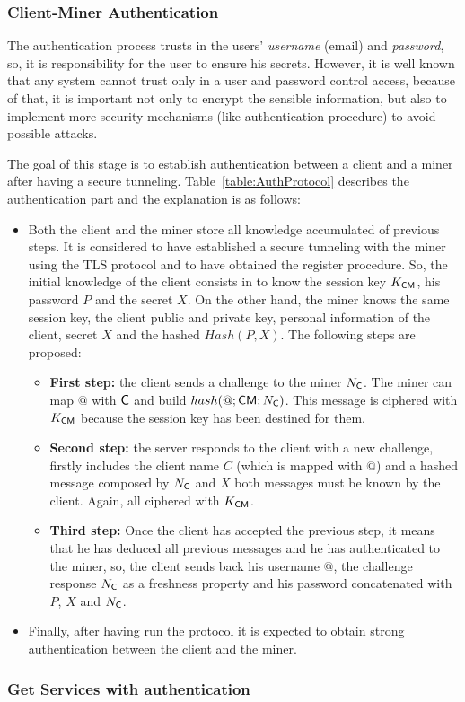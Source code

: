 \subsubsection{Client-Miner Authentication}
\label{ssec:SecAuth}


The authentication process trusts in the users' \textit{username} 
(email) and \textit{password}, so, it is responsibility for the user 
to ensure his secrets. However, it is well known that any system 
cannot trust only in a user and password control access, because of that, 
it is important not only to encrypt the sensible information, but also
to implement more security mechanisms (like authentication procedure) to 
avoid possible attacks.

The goal of this stage is to establish authentication between a client and 
a miner after having a secure tunneling. Table~\ref{table:AuthProtocol} 
describes the authentication part and the explanation is as follows:

\begin{itemize}
  \item Both the client and the miner store all knowledge accumulated
    of previous steps. It is considered to have established a secure tunneling 
    with the miner using the TLS protocol and to have obtained the register
    procedure. So, the initial knowledge of the client consists in to know 
    the session key $K_{\textsf{C}\textsf{M}}$, his password $P$ and the secret $X$. 
    On the other hand, the miner knows the same session key, the client public and
    private key, personal information of the client, secret $X$ and the hashed 
    $Hash(P,X)$. The following steps are proposed:
    \begin{itemize}
    \item \textbf{First step:} the client sends a challenge to the
      miner $N_{\textsf{C}}$. The miner can map $@$ with $\textsf{C}$ and build $hash(@;\textsf{C}\textsf{M}; N_{\textsf{C}})$. This message is ciphered with $K_{\textsf{C}\textsf{M}}$ because the session key has been destined for them. 
    \item \textbf{Second step:} the server responds to the client with a new challenge,
      firstly includes the client name $C$ (which is mapped with $@$) and a hashed message
      composed by $N_{\textsf{C}}$ and $X$ both messages must be known by the client. Again,
      all ciphered with $K_{\textsf{C}\textsf{M}}$.
    \item \textbf{Third step:} Once the client has accepted the previous step, it means that
      he has deduced all previous messages and he has authenticated to the miner, so, the 
      client sends back his username $@$, the challenge response $N_{\textsf{C}}$ as a freshness
      property and his password concatenated with $P$, $X$ and $N_{\textsf{C}}$.
  \end{itemize}
\item Finally, after having run the protocol it is expected to obtain strong authentication
    between the client and the miner. 
\end{itemize}
 


\subsubsection{Get Services with authentication}
\label{ssec:getServAuth}





